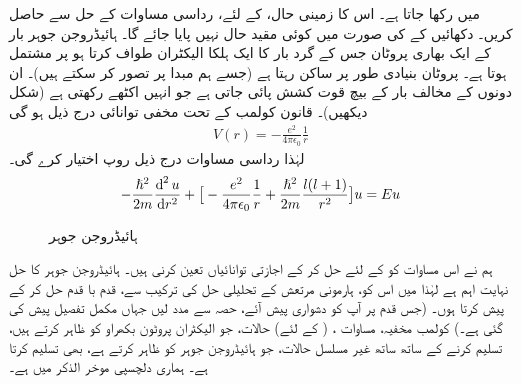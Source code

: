 میں رکھا جاتا ہے۔ اس کا زمینی حال،   کے لئے،  رداسی مساوات کے حل سے حاصل کریں۔ دکھائیں کے
 کی صورت میں کوئی مقید حال نہیں پایا جائے گا۔
ہائیڈروجن جوہر بار  کے  ایک بھاری پروٹان جس کے گرد بار  کا ایک ہلکا الیکٹران طواف کرتا ہو پر مشتمل ہوتا ہے۔ پروٹان بنیادی طور پر ساکن رہتا ہے (جسے ہم مبدا پر تصور کر سکتے ہیں)۔  ان دونوں کے مخالف بار کے بیچ قوت کشش پائی جاتی ہے جو انہیں اکٹھے رکھتی ہے  (شکل  دیکھیں)۔  قانون کولمب کے تحت مخفی توانائی درج ذیل ہو گی  
 \begin{align}\label{مساوات_ابعادی_کولمب_مخفیہ}
V(r)=-\frac{e^{2}}{4\pi\epsilon_{0}}\frac{1}{r} 
\end{align}
لہٰذا رداسی مساوات  درج ذیل روپ اختیار کرے گی۔
\begin{align}\label{مساوات_ابعادی_رداسی_کولمب}
-\frac{\hslash^{2}}{2m}\frac{\dif^{\,2}{u}}{\dif r^{2}}+\big[-\frac{e^{2}}{4\pi\epsilon_{0}}\frac{1}{r}+\frac{\hslash^{2}}{2m}\frac{l(l+1)}{r^{2}}\big]u=Eu 
\end{align}


\begin{figure}
\centering
{}
\caption{ہائیڈروجن  جوہر}
\label{شکل_تین_ابعادی_ہائیڈروجن_جوہر}
\end{figure}


 ہم نے اس مساوات کو     کے لئے حل کر کے اجازتی توانائیاں  تعین کرنی ہیں۔  ہائیڈروجن جوہر کا حل نہایت اہم ہے لہٰذا میں اس کو، ہارمونی مرتعش کے تحلیلی حل کی ترکیب سے، قدم با قدم حل کر کے پیش کرتا ہوں۔ (جس قدم پر آپ کو دشواری پیش آئے، حصہ  سے مدد لیں جہاں مکمل تفصیل پیش کی گئی ہے۔)  کولمب مخفیہ، مساوات ،    ( کے لئے)   حالات، جو الیکٹران پروٹون بکھراو کو ظاہر کرتے ہیں، تسلیم کرنے کے ساتھ ساتھ غیر مسلسل  حالات، جو ہائیڈروجن جوہر کو ظاہر کرتے ہے، بھی تسلیم کرتا ہے۔ ہماری دلچسپی موخر الذکر میں ہے۔

